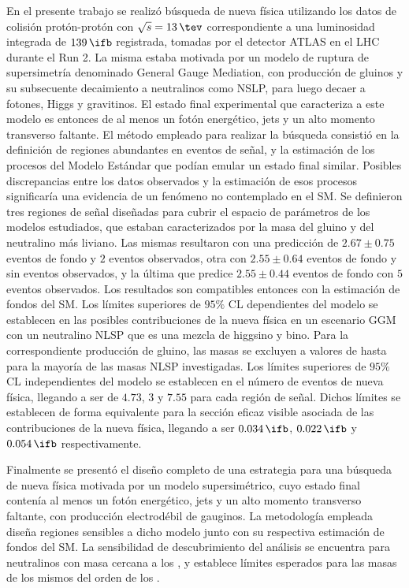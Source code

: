 En el presente trabajo se realizó búsqueda de nueva física utilizando los datos de colisión protón-protón con $\sqrt{s}=13\,\tev$ correspondiente a una luminosidad integrada de $139\,\ifb$ registrada, tomadas por el detector ATLAS en el LHC durante el Run 2. La misma estaba motivada por un modelo de ruptura de supersimetría denominado General Gauge Mediation, con producción de gluinos y su subsecuente decaimiento a neutralinos como NSLP, para luego decaer a fotones, Higgs y gravitinos. El estado final experimental que caracteriza a este modelo es entonces de al menos un fotón energético, jets y un alto momento transverso faltante. El método empleado para realizar la búsqueda consistió en la definición de regiones abundantes en eventos de señal, y la estimación de los procesos del Modelo Estándar que podían emular un estado final similar. Posibles discrepancias entre los datos observados y la estimación de esos procesos significaría una evidencia de un fenómeno no contemplado en el SM. 
Se definieron tres regiones de señal diseñadas para cubrir el espacio de parámetros de los modelos estudiados, que estaban caracterizados por la masa del gluino y del neutralino más liviano. Las mismas resultaron con una predicción de $2.67 \pm 0.75$ eventos de fondo y $2$ eventos observados, otra con $2.55 \pm 0.64$ eventos de fondo y sin eventos observados, y la última que predice $2.55 \pm 0.44$ eventos de fondo con $5$ eventos observados.
Los resultados son compatibles entonces con la estimación de fondos del SM. Los límites superiores de $95\%$ CL dependientes del modelo se establecen en las posibles contribuciones de la nueva física en un escenario GGM con un neutralino NLSP que es una mezcla de higgsino y bino. Para la correspondiente producción de gluino, las masas se excluyen a valores de hasta  para la mayoría de las masas NLSP investigadas. Los límites superiores de $95\%$ CL independientes del modelo se establecen en el número de eventos de nueva física, llegando a ser de $4.73$, $3$ y $7.55$ para cada región de señal. Dichos límites se establecen de forma equivalente para la sección eficaz visible asociada de las contribuciones de la nueva física, llegando a ser $0.034\,\ifb$, $0.022\,\ifb$ y $0.054\,\ifb$ respectivamente. 

Finalmente se presentó el diseño completo de una estrategia para una búsqueda de nueva física motivada por un modelo supersimétrico, cuyo estado final contenía al menos un fotón energético, jets y un alto momento transverso faltante, con producción electrodébil de gauginos. La metodología empleada diseña regiones sensibles a dicho modelo junto con su respectiva estimación de fondos del SM. La sensibilidad de descubrimiento del análisis se encuentra para neutralinos con masa cercana a los , y establece límites esperados para las masas de los mismos del orden de los .